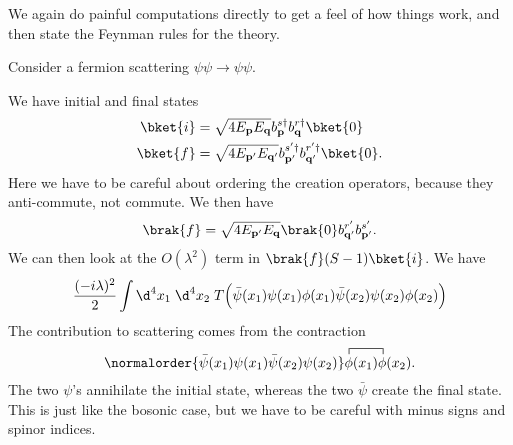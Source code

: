 \documentclass[a4paper]{article}
\begin{document}
We again do painful computations directly to get a feel of how things work, and then state the Feynman rules for the theory.
\begin{eg}
  Consider a fermion scattering $\psi\psi \to \psi\psi$.
  \begin{center}
  \end{center}
  We have initial and final states
  \begin{align*}
    \bket{i} &= \sqrt{4 E_\mathbf{p} E_\mathbf{q}} b_\mathbf{p}^{s\dagger}b_\mathbf{q}^{r\dagger} \bket{0}\\
    \bket{f} &= \sqrt{4 E_{\mathbf{p}'} E_{\mathbf{q}'}} b_{\mathbf{p}'}^{s'\dagger}b_{\mathbf{q}'}^{r'\dagger} \bket{0}.
  \end{align*}
  Here we have to be careful about ordering the creation operators, because they anti-commute, not commute. We then have
  \[
    \brak{f} = \sqrt{4 E_{\mathbf{p}'} E_{\mathbf{q}}} \brak{0} b_{\mathbf{q}'}^{r'} b_{\mathbf{p}'}^{s'}.
  \]
  We can then look at the $O(\lambda^2)$ term in $\brak{f}(S - 1)\bket{i}$. We have
  \[
    \frac{(-i\lambda)^2}{2} \int \d^4 x_1 \;\d^4 x_2\; T\Big(\bar\psi(x_1) \psi(x_1) \phi(x_1) \bar\psi(x_2) \psi(x_2) \phi(x_2)\Big)
  \]
  The contribution to scattering comes from the contraction
  \[
    \normalorder{\bar\psi(x_1) \psi(x_1) \bar\psi(x_2) \psi(x_2)} \contraction{}{\phi}{(x_1)}{\phi}\phi(x_1) \phi(x_2).
  \]
  The two $\psi$'s annihilate the initial state, whereas the two $\bar\psi$ create the final state. This is just like the bosonic case, but we have to be careful with minus signs and spinor indices.


\end{eg}
\end{document}
